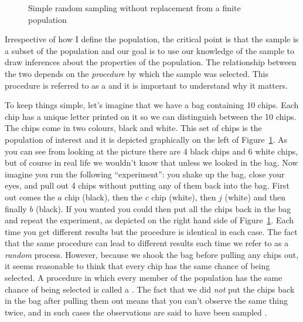
\begin{figure}[t]
\begin{center}
\end{center}
\caption{Simple random sampling without replacement from a finite population}
\label{fig:srs1}
\HR
\end{figure}

Irrespective of how I define the population, the critical point is that the sample is a subset of the population and our goal is to use our knowledge of the sample to draw inferences about the properties of the population. The relationship between the two depends on the {\it procedure} by which the sample was selected. This procedure is referred to as a  and it is important to understand why it matters.

To keep things simple, let's imagine that we have a bag containing 10 chips. Each chip has a unique letter printed on it so we can distinguish between the 10 chips. The chips come in two colours, black and white. This set of chips is the population of interest and it is depicted graphically on the left of Figure~\ref{fig:srs1}. As you can see from looking at the picture there are 4 black chips and 6 white chips, but of course in real life we wouldn't know that unless we looked in the bag. Now imagine you run the following ``experiment'': you shake up the bag, close your eyes, and pull out 4 chips without putting any of them back into the bag. First out comes the $a$ chip (black), then the $c$ chip (white), then $j$ (white) and then finally $b$ (black). If you wanted you could then put all the chips back in the bag and repeat the experiment, as depicted on the right hand side of Figure~\ref{fig:srs1}. Each time you get different results but the procedure is identical in each case. The fact that the same procedure can lead to different results each time we refer to as a {\it random} process. However, because we shook the bag before pulling any chips out, it seems reasonable to think that every chip has the same chance of being selected. A procedure in which every member of the population has the same chance of being selected is called a . The fact that we did {\it not} put the chips back in the bag after pulling them out means that you can't observe the same thing twice, and in such cases the observations are said to have been sampled . 

